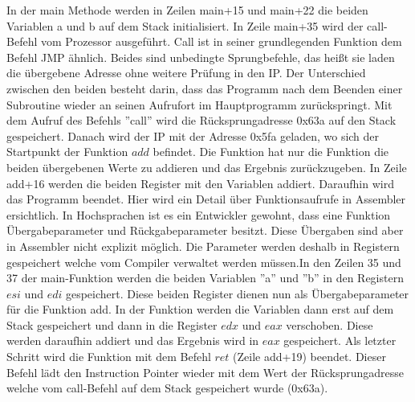 \documentclass[12pt]{article}
\begin{document}
\par\smallskip\noindent In der main Methode werden in Zeilen main+15 und main+22 die beiden Variablen a und b auf dem Stack initialisiert. In Zeile main+35 wird der call-Befehl vom Prozessor ausgeführt. Call ist in seiner grundlegenden Funktion dem Befehl JMP ähnlich. Beides sind unbedingte Sprungbefehle, das heißt sie laden die übergebene Adresse ohne weitere Prüfung in den IP. Der Unterschied zwischen den beiden besteht darin, dass das Programm nach dem Beenden einer Subroutine wieder an seinen Aufrufort im Hauptprogramm zurückspringt. Mit dem Aufruf des Befehls ''call'' wird die Rücksprungadresse 0x63a auf den Stack gespeichert. Danach wird der IP mit der Adresse 0x5fa geladen, wo sich der Startpunkt der Funktion $add$ befindet. Die Funktion hat nur die Funktion die beiden übergebenen Werte zu addieren und das Ergebnis zurückzugeben. In Zeile add+16 werden die beiden Register mit den Variablen addiert. Daraufhin wird das Programm beendet. Hier wird ein Detail über Funktionsaufrufe in Assembler ersichtlich. In Hochsprachen ist es ein Entwickler gewohnt, dass eine Funktion Übergabeparameter und Rückgabeparameter besitzt. Diese Übergaben sind aber in Assembler nicht explizit möglich. Die Parameter werden deshalb in Registern gespeichert welche vom Compiler verwaltet werden müssen.In den Zeilen 35 und 37 der main-Funktion werden die beiden Variablen ''a'' und ''b'' in den Registern $esi$ und $edi$ gespeichert. Diese beiden Register dienen nun als Übergabeparameter für die Funktion add. In der Funktion werden die Variablen dann erst auf dem Stack gespeichert und dann in die Register $edx$ und $eax$ verschoben. Diese werden daraufhin addiert und das Ergebnis wird in $eax$ gespeichert. Als letzter Schritt wird die Funktion mit dem Befehl $ret$ (Zeile add+19) beendet. Dieser Befehl lädt den Instruction Pointer wieder mit dem Wert der Rücksprungadresse welche vom call-Befehl auf dem Stack gespeichert wurde (0x63a).
\newpage
\end{document}
